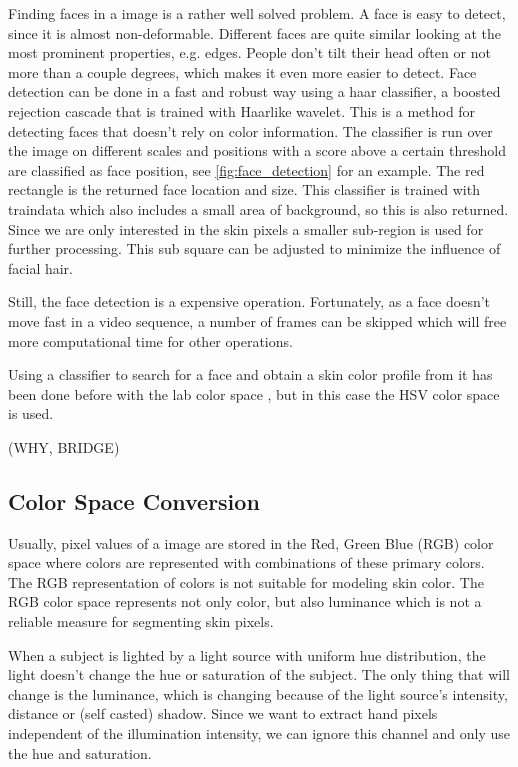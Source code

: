 Finding faces in a image is a rather well solved problem. A face is easy to detect, since it is almost non-deformable. Different faces are quite similar looking at the most prominent properties, e.g. edges. People don't tilt their head often or not more than a couple degrees, which makes it even more easier to detect. Face detection can be done in a fast and robust way using a haar classifier, a boosted rejection cascade that is trained with Haar\-like wavelet\cite{Viola2001,Viola2004}. This is a method for detecting faces that doesn't rely on color information. The classifier is run over the image on different scales and positions with a score above a certain threshold are classified as face position, see \autoref{fig:face_detection} for an example. The red rectangle is the returned face location and size. This classifier is trained with traindata which also includes a small area of background, so this is also returned. Since we are only interested in the skin pixels a smaller sub-region is used for further processing. This sub square can be adjusted to minimize the influence of facial hair. 

Still, the face detection is a expensive operation. Fortunately, as a face doesn't move fast in a video sequence, a number of frames can be skipped which will free more computational time for other operations.

Using a classifier to search for a face and obtain a skin color profile from it has been done before with the lab color space \cite{Stenger2006}, but in this case the HSV color space is used.


(WHY, BRIDGE)

\subsection*{Color Space Conversion}
Usually, pixel values of a image are stored in the Red, Green Blue (RGB) color space where colors are represented with combinations of these primary colors. The RGB representation of colors is not suitable for modeling skin color. The RGB color space represents not only color, but also luminance which is not a reliable measure for segmenting skin pixels\cite{Cai1999}.

When a subject is lighted by a light source with uniform hue distribution, the light doesn't change the hue or saturation of the subject. The only thing that will change is the luminance, which is changing because of the light source's intensity, distance or (self casted) shadow. Since we want to extract hand pixels independent of the illumination intensity, we can ignore this channel and only use the hue and saturation.

